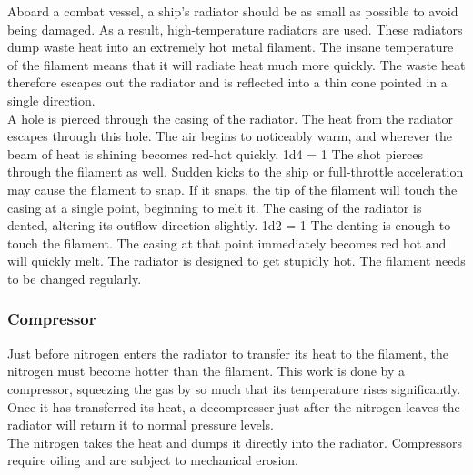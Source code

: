 \documentclass[a4paper]{article}
\begin{document}
Aboard a combat vessel, a ship's radiator should be as small as possible to avoid being damaged. As a result, high-temperature radiators are used. These radiators dump waste heat into an extremely hot metal filament. The insane temperature of the filament means that it will radiate heat much more quickly. The waste heat therefore escapes out the radiator and is reflected into a thin cone pointed in a single direction.
\\ \pbhw
{A hole is pierced through the casing of the radiator. The heat from the radiator escapes through this hole. The air begins to noticeably warm, and wherever the beam of heat is shining becomes red-hot quickly. \newline 1d4 = 1 The shot pierces through the filament as well. Sudden kicks to the ship or full-throttle acceleration may cause the filament to snap. If it snaps, the tip of the filament will touch the casing at a single point, beginning to melt it.}
{The casing of the radiator is dented, altering its outflow direction slightly. \newline 1d2 = 1 The denting is enough to touch the filament. The casing at that point immediately becomes red hot and will quickly melt.}
{The radiator is designed to get stupidly hot.}
{The filament needs to be changed regularly.} 


\vspace{-0.5cm} \hspace{-18pt} \subsubsection{Compressor} \label{thermal_compressor} \vspace{-0.2cm}
Just before nitrogen enters the radiator to transfer its heat to the filament, the nitrogen must become hotter than the filament. This work is done by a compressor, squeezing the gas by so much that its temperature rises significantly. Once it has transferred its heat, a decompresser just after the nitrogen leaves the radiator will return it to normal pressure levels.
\\ \pbhw
{}
{}
{The nitrogen takes the heat and dumps it directly into the radiator.}
{Compressors require oiling and are subject to mechanical erosion.}
\end{document}
